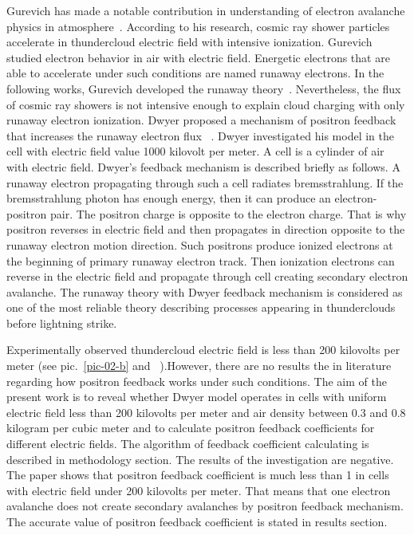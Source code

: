 \documentclass{webofc}
\begin{document}
Gurevich has made a notable contribution in understanding of electron avalanche physics in atmosphere~\cite{gurevich1992runaway}. According to his research, cosmic ray shower particles accelerate in thundercloud electric field with intensive ionization. Gurevich studied electron behavior in air with electric field. Energetic electrons that are able to accelerate under such conditions are named runaway electrons. In the following works, Gurevich developed the runaway theory~\cite{gurevich1999lightning,gurevich2001kinetic}. Nevertheless, the flux of cosmic ray showers is not intensive enough to explain cloud charging with only runaway electron ionization.
Dwyer proposed a mechanism of positron feedback that increases the runaway electron flux ~\cite{dwyer2003fundamental}. Dwyer investigated his model in the cell with electric field value 1000 kilovolt per meter. A cell is a cylinder of air with electric field. Dwyer’s feedback mechanism is described briefly as follows. A runaway electron propagating through such a cell radiates bremsstrahlung. If the bremsstrahlung photon has enough energy, then it can produce an electron-positron pair. The positron charge is opposite to the electron charge. That is why positron reverses in electric field and then propagates in direction opposite to the runaway electron motion direction. Such positrons produce ionized electrons at the beginning of primary runaway electron track. Then ionization electrons can reverse in the electric field and propagate through cell creating secondary electron avalanche. The runaway theory with Dwyer feedback mechanism is considered as one of the most reliable theory describing processes appearing in thunderclouds before lightning strike.


Experimentally observed thundercloud electric field is less than 200 kilovolts per meter (see pic.~\ref{pic-02-b} and ~\cite{}).However, there are no results the in literature regarding how positron feedback works under such conditions. The aim of the present work is to reveal whether Dwyer model operates in cells with uniform electric field less than 200 kilovolts per meter and air density between 0.3 and 0.8 kilogram per cubic meter and to calculate positron feedback coefficients for different electric fields. The algorithm of feedback coefficient calculating is described in methodology section.
The results of the investigation are negative. The paper shows that positron feedback coefficient is much less than 1 in cells with electric field under 200 kilovolts per meter. That means that one electron avalanche does not create secondary avalanches by positron feedback mechanism. The accurate value of positron feedback coefficient is stated in results section.
\end{document}
